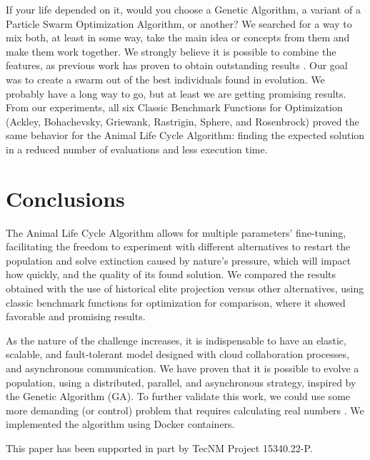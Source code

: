 \documentclass[graybox]{svmult}
\begin{document}
    If your life depended on it, would you choose a Genetic Algorithm, a
    variant of a Particle Swarm Optimization Algorithm, or another? We searched
    for a way to mix both, at least in some way, take the main idea or concepts
    from them and make them work together. We strongly believe it is possible
    to combine the features, as previous work has proven to obtain outstanding
    results \cite{garcia2015evospace,garcia2021event,valdez2021container,valdez2021swarm}.
    Our goal was to create a swarm out of the best individuals found in
    evolution. We probably have a long way to go, but at least we are getting
    promising results. From our experiments, all six Classic Benchmark
    Functions for Optimization (Ackley, Bohachevsky, Griewank, Rastrigin,
    Sphere, and Rosenbrock) proved the same behavior for the Animal Life Cycle
    Algorithm: finding the expected solution in a reduced number of evaluations
    and less execution time.


\section{Conclusions}
    \label{section.conclusions}

    The Animal Life Cycle Algorithm allows for multiple parameters'
    fine-tuning, facilitating the freedom to experiment with different
    alternatives to restart the population and solve extinction caused by
    nature's pressure, which will impact how quickly, and the quality of its
    found solution. We compared the results obtained with the use of historical
    elite projection versus other alternatives, using classic benchmark
    functions for optimization for comparison, where it showed favorable and
    promising results.

    As the nature of the challenge increases, it is indispensable to have an
    elastic, scalable, and fault-tolerant model designed with cloud
    collaboration processes, and asynchronous communication. We have proven
    that it is possible to evolve a population, using a distributed, parallel,
    and asynchronous strategy, inspired by the Genetic Algorithm (GA). To
    further validate this work, we could use some more demanding (or control)
    problem that requires calculating real numbers
    \cite{stanley2002evolving,miikkulainen2019evolving}. We implemented the
    algorithm using Docker containers.


\begin{acknowledgement}
    This paper has been supported in part by TecNM Project 15340.22-P.
\end{acknowledgement}

%


%

\end{document}
